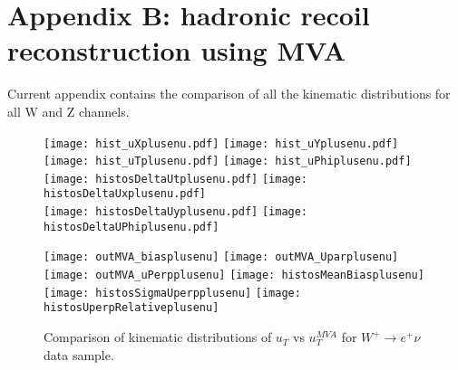 \chapter*{Appendix B: hadronic recoil reconstruction using MVA}
    Current appendix contains the comparison of all the kinematic distributions for all W and Z channels.
    
    \begin{figure}[h]
    	\centering
    	{\texttt{[image: hist\_uXplusenu.pdf]}}
    	{\texttt{[image: hist\_uYplusenu.pdf]}} \\
    	{\texttt{[image: hist\_uTplusenu.pdf]}}
    	{\texttt{[image: hist\_uPhiplusenu.pdf]}}\\
    	{\texttt{[image: histosDeltaUtplusenu.pdf]}}
    	{\texttt{[image: histosDeltaUxplusenu.pdf]}} \\
    	{\texttt{[image: histosDeltaUyplusenu.pdf]}}
    	{\texttt{[image: histosDeltaUPhiplusenu.pdf]}}\\
    	\label{fig:plusenu_data_distributions1}
    \end{figure}
    \begin{figure}[h]
    	\centering
    	{\texttt{[image: outMVA\_biasplusenu]}}
    	{\texttt{[image: outMVA\_Uparplusenu]}}
    	{\texttt{[image: outMVA\_uPerpplusenu]}}
    	{\texttt{[image: histosMeanBiasplusenu]}}
    	{\texttt{[image: histosSigmaUperpplusenu]}}
    	{\texttt{[image: histosUperpRelativeplusenu]}}
    	\caption{Comparison of kinematic distributions of $u_T$ vs $u_T^{MVA}$ for $W^+\rightarrow e^+\nu$ data sample.}
    	\label{fig:plusenu_data_distributions2}
    \end{figure}
    
